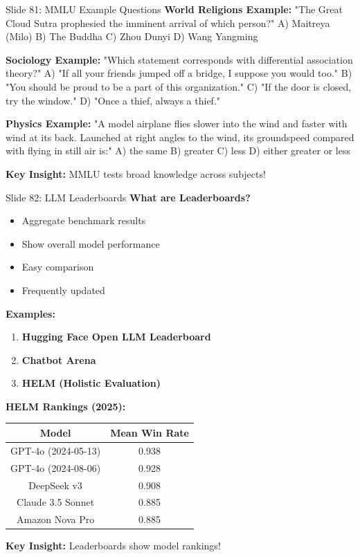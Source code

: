 \documentclass[8pt]{beamer}
\begin{document}
	\begin{frame}{Slide 81: MMLU Example Questions}
		\fontsize{6.5}{7.5}\selectfont
		\textbf{World Religions Example:}
		"The Great Cloud Sutra prophesied the imminent arrival of which person?"
		A) Maitreya (Milo) \checkmark
		B) The Buddha
		C) Zhou Dunyi
		D) Wang Yangming
		
		\vspace{0.1cm}
		\textbf{Sociology Example:}
		"Which statement corresponds with differential association theory?"
		A) "If all your friends jumped off a bridge, I suppose you would too." \checkmark
		B) "You should be proud to be a part of this organization."
		C) "If the door is closed, try the window."
		D) "Once a thief, always a thief."
		
		\vspace{0.1cm}
		\textbf{Physics Example:}
		"A model airplane flies slower into the wind and faster with wind at its back. Launched at right angles to the wind, its groundspeed compared with flying in still air is:"
		A) the same
		B) greater \checkmark
		C) less
		D) either greater or less
		
		\textcolor{myblue}{\textbf{Key Insight:}} MMLU tests broad knowledge across subjects!
	\end{frame}
	
	\begin{frame}{Slide 82: LLM Leaderboards}
		\fontsize{6.5}{7.5}\selectfont
		\textbf{What are Leaderboards?}
		\begin{itemize}
			\item Aggregate benchmark results
			\item Show overall model performance
			\item Easy comparison
			\item Frequently updated
		\end{itemize}
		
		\vspace{0.1cm}
		\textbf{Examples:}
		\begin{enumerate}
			\item \textbf{Hugging Face Open LLM Leaderboard}
			\item \textbf{Chatbot Arena}
			\item \textbf{HELM (Holistic Evaluation)}
		\end{enumerate}
		
		\vspace{0.1cm}
		\textbf{HELM Rankings (2025):}
		\begin{tabular}{|c|c|}
			\hline
			\textbf{Model} & \textbf{Mean Win Rate} \\
			\hline
			GPT-4o (2024-05-13) & 0.938 \\
			GPT-4o (2024-08-06) & 0.928 \\
			DeepSeek v3 & 0.908 \\
			Claude 3.5 Sonnet & 0.885 \\
			Amazon Nova Pro & 0.885 \\
			\hline
		\end{tabular}
		
		\textcolor{myblue}{\textbf{Key Insight:}} Leaderboards show model rankings!
	\end{frame}
	
\end{document}
